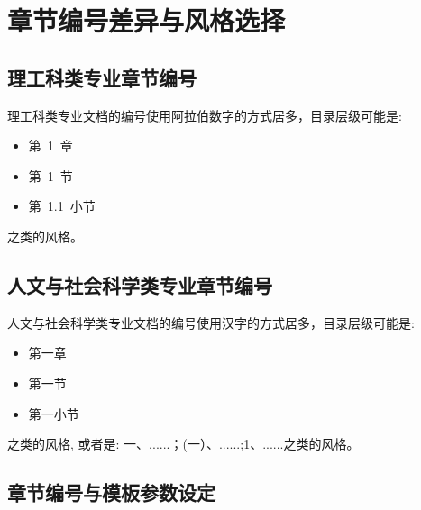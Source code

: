 \section{章节编号差异与风格选择}

\subsection{理工科类专业章节编号}

理工科类专业文档的编号使用阿拉伯数字的方式居多，目录层级可能是: 
\begin{itemize}
\item 第~1~章
\item \quad 第~1~节
\item \qquad 第~1.1~小节
\end{itemize}
之类的风格。


\subsection{人文与社会科学类专业章节编号}

人文与社会科学类专业文档的编号使用汉字的方式居多，目录层级可能是: 
\begin{itemize}
\item 第一章
\item \quad 第一节
\item \qquad 第一小节
\end{itemize}
之类的风格, 或者是: 一、......；(一）、......;1、......之类的风格。

\subsection{章节编号与模板参数设定}

